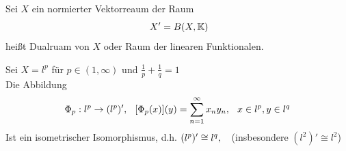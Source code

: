 \begin{definition}
 Sei $X$ ein normierter Vektorreaum der Raum
 \[ X' = B(X, \MdK) \]	
 hei{\ss}t Dualruam von $X$ oder Raum der linearen Funktionalen.
\end{definition}

\begin{beispiel}
	Sei $X = l^{p}$ für $p \in (1, \infty)$ und $\frac{1}{p} + \frac{1}{q} = 1$ \\
	Die Abbildung
	\[ \Phi_{p} : l^{p} \rightarrow (l^{p})', \hspace{0.25cm} [\Phi_{p}(x)](y) = \sum_{n = 1}^{\infty} x_{n} y_{n}, \hspace{0.25cm} x \in l^{p}, y \in l^{q}  \]
	Ist ein isometrischer Isomorphismus, d.h.  $(l^{p})' \cong l^{q}, \hspace{0.25cm}$ (insbesondere $(l^{2})' \cong l^{2}$)
	

\end{beispiel}
